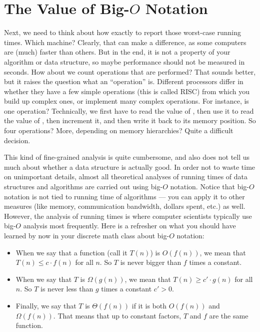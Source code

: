 \section{The Value of Big-$O$ Notation}
Next, we need to think about how exactly to report those worst-case
running times. Which machine? Clearly, that can make a difference,
as some computers are (much) faster than others.
But in the end, it is not a property of your algorithm or data structure,
so maybe performance should not be measured in seconds.
How about we count operations that are performed?
That sounds better, but it raises the question what an ``operation'' is.
Different processors differ in whether they have a few simple
operations (this is called RISC) from which you build up complex ones,
or implement many complex operations.
For instance, is  one operation?
Technically, we first have to read the value of ,
then use it to read the value of ,
then increment it, and then write it back to its memory position.
So four operations?
More, depending on memory hierarchies?
Quite a difficult decision.

This kind of fine-grained analysis is quite cumbersome, and also does
not tell us much about whether a data structure is actually good. 
In order not to waste time on unimportant details,
almost all theoretical analyses of running times of data structures and
algorithms are carried out using big-$O$ notation. 
Notice that big-$O$ notation is not tied to running time of algorithms
--- you can apply it to other measures (like memory, communication
bandwidth, dollars spent, etc.) as well.
However, the analysis of running times is where computer scientists
typically use big-$O$ analysis most frequently.
Here is a refresher on what you should have learned by now in your
discrete math class about big-$O$ notation:

\begin{itemize}
\item When we say that a function (call it $T(n)$) is
$O(f(n))$, we mean that $T(n) \leq c \cdot f(n)$ for all $n$.
So $T$ is never bigger than $f$ times a constant.
\item When we say that $T$ is $\Omega(g(n))$,
we mean that $T(n) \geq c' \cdot g(n)$ for all $n$.
So $T$ is never less than $g$ times a constant $c' > 0$.
\item Finally, we say that $T$ is $\Theta(f(n))$ if it is both
  $O(f(n))$ and $\Omega(f(n))$. That means that up to constant
  factors, $T$ and $f$ are the same function.
\end{itemize}

